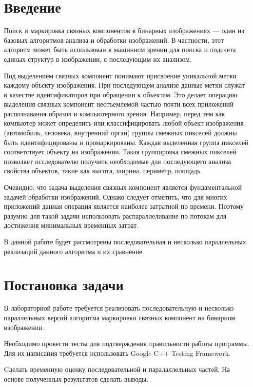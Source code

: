 \documentclass{report}
\begin{document}
	\setcounter{page}{2}


	\tableofcontents
	\newpage


	\section*{Введение}
		\par Поиск и маркировка связных компонентов в бинарных изображениях — один из базовых алгоритмов анализа и обработки изображений. В частности, этот алгоритм может быть использован в машинном зрении для поиска и подсчета единых структур в изображении, с последующим их анализом.
		\par Под выделением связных компонент понимают присвоение уникальной метки каждому объекту изображения. При последующем анализе данные метки служат в качестве идентификаторов при обращении к объектам. Это делает операцию выделения связных компонент неотъемлемой частью почти всех приложений распознавания образов и компьютерного зрения. Например, перед тем как компьютер может определить или классифицировать любой объект изображения (автомобиль, человека, внутренний орган) группы смежных пикселей должны быть идентифицированы и промаркированы. Каждая выделенная группа пикселей соответствует объекту на изображении. Такая группировка смежных пикселей позволяет исследователю получить необходимые для последующего анализа свойства объектов, такие как высота, ширина, периметр, площадь.
		\par Очевидно, что задача выделения связных компонент является фундаментальной задачей обработки изображений. Однако следует отметить, что для многих приложений данная операция является наиболее затратной по времени. Поэтому разумно для такой задачи использовать распараллеливание по потокам для достижения минимальных временных затрат.
		\par В данной работе будет рассмотрены последовательная и несколько параллельных реализаций данного алгоритма и их сравнение.
	\newpage


	\section*{Постановка задачи}
		\par В лабораторной работе требуется реализовать последовательную и несколько параллельных версий алгоритма маркировки связных компонент на бинарном изображении.
		\par Необходимо провести тесты для подтверждения правильности работы программы. Для их написания требуется использовать Google C++ Testing Framework.
		\par Cделать временную оценку последовательной и паралаллельных частей. На основе полученных результатов сделать выводы.
	\newpage
\end{document}
